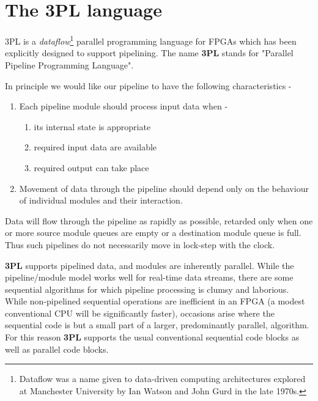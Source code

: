     \section{The 3PL language}

        3PL is a {\em dataflow}\footnote{Dataflow was a name
        given to data-driven computing architectures explored at Manchester
        University by Ian Watson and John Gurd in the late 1970s.} parallel
        programming language for FPGAs which has been explicitly designed to
        support pipelining. The name {\bf 3PL} stands for "Parallel Pipeline
        Programming Language".

        In principle we would like our pipeline to have the following
        characteristics -
        \begin{enumerate}
        \item    Each pipeline module should process input data when -
                \begin{enumerate}
                \item    its internal state is appropriate
                \item    required input data are available
                \item    required output can take place
                \end{enumerate}
        \item   Movement of data through the pipeline should depend only
                on the behaviour of individual modules and their
                interaction.
        \end{enumerate}

        Data will flow through the pipeline as rapidly as possible, retarded
        only when one or more source module queues are empty or a destination
        module queue is full. Thus such pipelines do not necessarily move
        in lock-step with the clock.

        {\bf 3PL} supports pipelined data, and modules are inherently
        parallel. While the pipeline/module model works well for real-time
        data streams, there are some sequential algorithms for which pipeline
        processing is clumsy and laborious. While non-pipelined sequential
        operations are inefficient in an FPGA (a modest conventional CPU will
        be significantly faster), occasions arise where the sequential code is
        but a small part of a larger, predominantly parallel, algorithm. For
        this reason {\bf 3PL} supports the usual conventional sequential
        code blocks as well as parallel code blocks.

